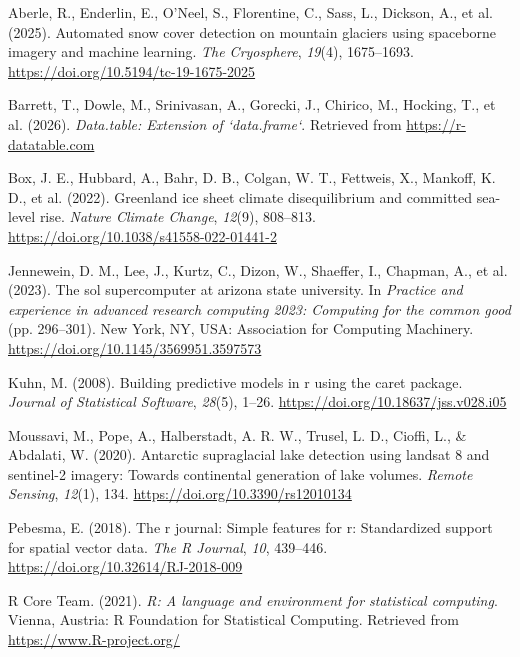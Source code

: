 \documentclass[
]{agujournal2019}
\newlength{\cslhangindent}
\newenvironment{CSLReferences}[2] %
 {\begin{list}{}{%
  \setlength{\itemindent}{0pt}
  \setlength{\leftmargin}{0pt}
  \setlength{\parsep}{0pt}
  \ifodd #1
   \setlength{\leftmargin}{\cslhangindent}
   \setlength{\itemindent}{-1\cslhangindent}
  \fi
  \setlength{\itemsep}{#2\baselineskip}}}
 {\end{list}}
\begin{document}
\label{refs}
\begin{CSLReferences}{1}{0}
\vspace{1em}

Aberle, R., Enderlin, E., O'Neel, S., Florentine, C., Sass, L., Dickson,
A., et al. (2025). Automated snow cover detection on mountain glaciers
using spaceborne imagery and machine learning. \emph{The Cryosphere},
\emph{19}(4), 1675--1693. \url{https://doi.org/10.5194/tc-19-1675-2025}

Barrett, T., Dowle, M., Srinivasan, A., Gorecki, J., Chirico, M.,
Hocking, T., et al. (2026). \emph{Data.table: Extension of
`data.frame`}. Retrieved from \url{https://r-datatable.com}

Box, J. E., Hubbard, A., Bahr, D. B., Colgan, W. T., Fettweis, X.,
Mankoff, K. D., et al. (2022). Greenland ice sheet climate
disequilibrium and committed sea-level rise. \emph{Nature Climate
Change}, \emph{12}(9), 808--813.
\url{https://doi.org/10.1038/s41558-022-01441-2}

Jennewein, D. M., Lee, J., Kurtz, C., Dizon, W., Shaeffer, I., Chapman,
A., et al. (2023). The sol supercomputer at arizona state university. In
\emph{Practice and experience in advanced research computing 2023:
Computing for the common good} (pp. 296--301). New York, NY, USA:
Association for Computing Machinery.
\url{https://doi.org/10.1145/3569951.3597573}

Kuhn, M. (2008). Building predictive models in r using the caret
package. \emph{Journal of Statistical Software}, \emph{28}(5), 1--26.
\url{https://doi.org/10.18637/jss.v028.i05}

Moussavi, M., Pope, A., Halberstadt, A. R. W., Trusel, L. D., Cioffi,
L., \& Abdalati, W. (2020). Antarctic supraglacial lake detection using
landsat 8 and sentinel-2 imagery: Towards continental generation of lake
volumes. \emph{Remote Sensing}, \emph{12}(1), 134.
\url{https://doi.org/10.3390/rs12010134}

Pebesma, E. (2018). The r journal: Simple features for r: Standardized
support for spatial vector data. \emph{The R Journal}, \emph{10},
439--446. \url{https://doi.org/10.32614/RJ-2018-009}

R Core Team. (2021). \emph{R: A language and environment for statistical
computing}. Vienna, Austria: R Foundation for Statistical Computing.
Retrieved from \url{https://www.R-project.org/}


\end{CSLReferences}
\end{document}
